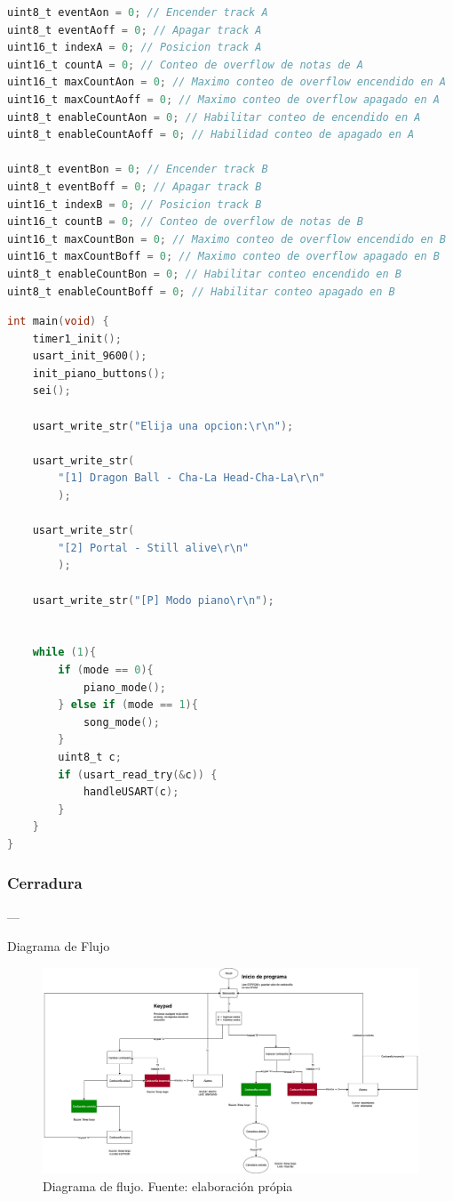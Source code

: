 \begin{lstlisting}[language=C, caption={Variables de control de flujo}]
uint8_t eventAon = 0; // Encender track A
uint8_t eventAoff = 0; // Apagar track A
uint16_t indexA = 0; // Posicion track A
uint16_t countA = 0; // Conteo de overflow de notas de A
uint16_t maxCountAon = 0; // Maximo conteo de overflow encendido en A
uint16_t maxCountAoff = 0; // Maximo conteo de overflow apagado en A
uint8_t enableCountAon = 0; // Habilitar conteo de encendido en A
uint8_t enableCountAoff = 0; // Habilidad conteo de apagado en A

uint8_t eventBon = 0; // Encender track B
uint8_t eventBoff = 0; // Apagar track B
uint16_t indexB = 0; // Posicion track B
uint16_t countB = 0; // Conteo de overflow de notas de B
uint16_t maxCountBon = 0; // Maximo conteo de overflow encendido en B
uint16_t maxCountBoff = 0; // Maximo conteo de overflow apagado en B
uint8_t enableCountBon = 0; // Habilitar conteo encendido en B
uint8_t enableCountBoff = 0; // Habilitar conteo apagado en B
\end{lstlisting}

\begin{lstlisting}[language=C, caption={Variables de control de flujo}]
int main(void) {
	timer1_init();
	usart_init_9600();
	init_piano_buttons();
	sei();
	
	usart_write_str("Elija una opcion:\r\n");
	
	usart_write_str(
		"[1] Dragon Ball - Cha-La Head-Cha-La\r\n"
		);

	usart_write_str(
		"[2] Portal - Still alive\r\n"
		);

	usart_write_str("[P] Modo piano\r\n");

	
	while (1){
		if (mode == 0){
			piano_mode();
		} else if (mode == 1){
			song_mode();
		}
	    uint8_t c;
	    if (usart_read_try(&c)) {
		    handleUSART(c);
	    }
	}
}
\end{lstlisting}

\subsubsection{Cerradura}---

Diagrama de Flujo

\begin{figure}[H]
    \centering
    \includegraphics[width=0.9\columnwidth]{anexos/cerradura/DiagramaFlujo.png}
    \caption{Diagrama de flujo. Fuente: elaboración própia}
    \label{fig:lcd_ui}
\end{figure}


